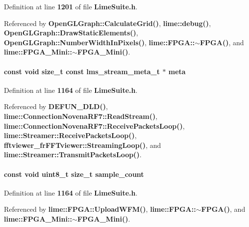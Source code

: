 Definition at line {\bf 1201} of file {\bf Lime\+Suite.\+h}.



Referenced by {\bf Open\+G\+L\+Graph\+::\+Calculate\+Grid()}, {\bf lime\+::debug()}, {\bf Open\+G\+L\+Graph\+::\+Draw\+Static\+Elements()}, {\bf Open\+G\+L\+Graph\+::\+Number\+Width\+In\+Pixels()}, {\bf lime\+::\+F\+P\+G\+A\+::$\sim$\+F\+P\+G\+A()}, and {\bf lime\+::\+F\+P\+G\+A\+\_\+\+Mini\+::$\sim$\+F\+P\+G\+A\+\_\+\+Mini()}.

\paragraph[{meta}]{\setlength{\rightskip}{0pt plus 5cm}const {\bf void} size\+\_\+t const {\bf lms\+\_\+stream\+\_\+meta\+\_\+t} $\ast$ meta}\label{group__FN__STREAM_ga98712045602c817c3807ce704b135f88}


Definition at line {\bf 1164} of file {\bf Lime\+Suite.\+h}.



Referenced by {\bf D\+E\+F\+U\+N\+\_\+\+D\+L\+D()}, {\bf lime\+::\+Connection\+Novena\+R\+F7\+::\+Read\+Stream()}, {\bf lime\+::\+Connection\+Novena\+R\+F7\+::\+Receive\+Packets\+Loop()}, {\bf lime\+::\+Streamer\+::\+Receive\+Packets\+Loop()}, {\bf fftviewer\+\_\+fr\+F\+F\+Tviewer\+::\+Streaming\+Loop()}, and {\bf lime\+::\+Streamer\+::\+Transmit\+Packets\+Loop()}.

\paragraph[{sample\+\_\+count}]{\setlength{\rightskip}{0pt plus 5cm}const {\bf void} uint8\+\_\+t size\+\_\+t sample\+\_\+count}\label{group__FN__STREAM_ga072869ef257c91ea95fe774cdbb4942e}


Definition at line {\bf 1164} of file {\bf Lime\+Suite.\+h}.



Referenced by {\bf lime\+::\+F\+P\+G\+A\+::\+Upload\+W\+F\+M()}, {\bf lime\+::\+F\+P\+G\+A\+::$\sim$\+F\+P\+G\+A()}, and {\bf lime\+::\+F\+P\+G\+A\+\_\+\+Mini\+::$\sim$\+F\+P\+G\+A\+\_\+\+Mini()}.

